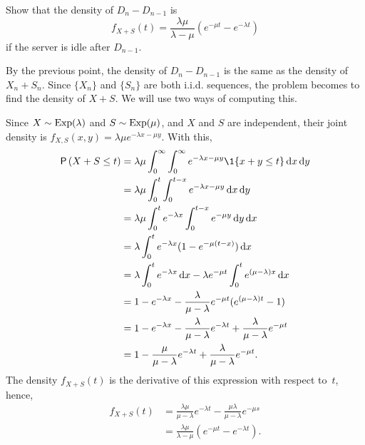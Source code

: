 \begin{exercise}
Show that the density of $D_{n} - D_{n-1}$ is
    \begin{equation*}
    f_{X+S}(t) = \frac{\lambda \mu}{\lambda - \mu} (e^{-\mu t} - e^{-\lambda t})
    \end{equation*}
if the server is idle after $D_{n-1}$.
    \begin{solution}
      By the previous point, the density of $D_{n} - D_{n-1}$ is the
      same as the density of $X_n + S_n$.  Since $\{X_n\}$ and $\{S_n\}$ are both i.i.d. sequences, the problem becomes to find the density of $X+S$.  We will use two ways of computing this. 

\newpage
Since $X\sim \operatorname{Exp}(\lambda)$ and $S\sim\operatorname{Exp}(\mu)$, and $X$ and $S$ are independent, their joint density is $f_{X,S}(x,y) = \lambda \mu e^{-\lambda x - \mu y}$. With this,
  \begin{align*}
\P{X+S\leq t } 
&= \lambda \mu \int_0^\infty \int_0^\infty e^{-\lambda x - \mu y} \1{x+y\leq t} \d x \d y \\
&= \lambda \mu \int_0^t \int_0^{t-x} e^{-\lambda x - \mu y} \d x \d y \\
&= \lambda \mu \int_0^t e^{-\lambda x} \int_0^{t-x} e^{- \mu y} \d y \d x \\
&= \lambda \int_0^t e^{-\lambda x} (1-e^{- \mu (t-x)} ) \d x  \\
&= \lambda \int_0^t e^{-\lambda x}  \d x - \lambda e^{-\mu t} \int_0^t e^{(\mu-\lambda) x} \d x \\
&= 1- e^{-\lambda x} - \frac{\lambda}{\mu-\lambda} e^{-\mu t} ( e^{(\mu-\lambda) t} -1) \\
&= 1- e^{-\lambda x} - \frac{\lambda}{\mu-\lambda} e^{-\lambda t} + \frac{\lambda}{\mu-\lambda} e^{-\mu t} \\ 
&= 1 - \frac{\mu}{\mu-\lambda} e^{-\lambda t} + \frac{\lambda}{\mu-\lambda} e^{-\mu t}. \\
  \end{align*}
The density $f_{X+S}(t)$ is the derivative of this expression with respect to~$t$, hence,
\begin{align*}
  f_{X+S}(t) 
&= \frac{\lambda\mu}{\mu-\lambda} e^{-\lambda t}  - \frac{\mu \lambda}{\mu-\lambda} e^{-\mu s} \\
&= \frac{\lambda\mu}{\lambda -\mu}(e^{-\mu t} - e^{-\lambda t}). \\
\end{align*}


\end{solution}
\end{exercise}
